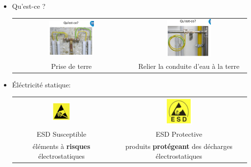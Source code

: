 \documentclass[a4paper]{article}
\begin{document}
\begin{itemize}
\item Qu'est-ce ?
\begin{center}
\begin{tabular}{cc}
    \includegraphics[width=0.4\textwidth]{images/elec06.PNG}
    &
    \includegraphics[width=0.4\textwidth]{images/elec07.PNG}
    \\
    Prise de terre
    &
    Relier la conduite d'eau à la terre
\end{tabular}
\end{center}





\item Éléctricité statique:
\begin{center}
    \begin{tabular}{cc}
        \includegraphics[width=0.2\textwidth]{images/elec08.PNG}
        &
        \includegraphics[width=0.2\textwidth]{images/elec09.PNG}
        \\
        ESD Susceptible
        &
        ESD Protective
        \\
        éléments à \textbf{risques} électrostatiques
        &
        produits \textbf{protégeant} des décharges électrostatiques
    \end{tabular}
\end{center}






\end{itemize}
\end{document}
